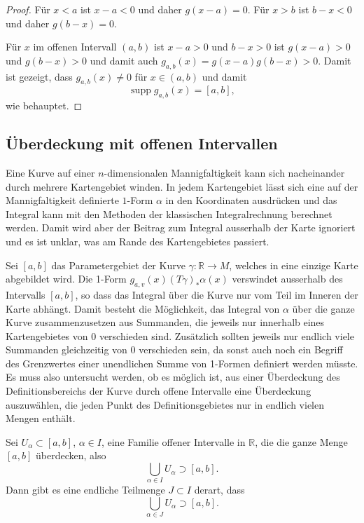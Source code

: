 \begin{proof}
Für $x<a$ ist $x-a<0$ und daher $g(x-a)=0$.
Für $x>b$ ist $b-x<0$ und daher $g(b-x)=0$.

Für $x$ im offenen Intervall $(a,b)$ ist $x-a>0$ und $b-x>0$ ist
$g(x-a)>0$ und $g(b-x)>0$ und damit
auch $g_{a,b}(x)=g(x-a)g(b-x)>0$.
Damit ist gezeigt, dass $g_{a,b}(x)\ne 0$ für $x\in(a,b)$ und damit
\[
\operatorname{supp} g_{a,b}(x)
=
[a,b],
\]
wie behauptet.
\end{proof}

%
%
\subsection{Überdeckung mit offenen Intervallen}
Eine Kurve auf einer $n$-dimensionalen Mannigfaltigkeit kann sich
nacheinander durch mehrere Kartengebiet winden.
In jedem Kartengebiet lässt sich eine auf der Mannigfaltigkeit
definierte $1$-Form $\alpha$ in den Koordinaten ausdrücken und das
Integral kann mit den Methoden der klassischen Integralrechnung
berechnet werden.
Damit wird aber der Beitrag zum Integral ausserhalb der Karte
ignoriert und es ist unklar, was am Rande des Kartengebietes
passiert.

Sei $[a,b]$ das Parametergebiet der Kurve $\gamma\colon\mathbb{R}\to M$,
welches in eine einzige Karte abgebildet wird.
Die 1-Form $g_{a,v}(x)(T\gamma)_*\alpha(x)$ verswindet ausserhalb
des Intervalls $[a,b]$, so dass das Integral über die Kurve nur
vom Teil im Inneren der Karte abhängt.
Damit besteht die Möglichkeit, das Integral von $\alpha$ über
die ganze Kurve zusammenzusetzen aus Summanden, die jeweils nur
innerhalb eines Kartengebietes von $0$ verschieden sind.
Zusätzlich sollten jeweils nur endlich viele Summanden gleichzeitig
von 0 verschieden sein, da sonst auch noch ein Begriff des Grenzwertes
einer unendlichen Summe von 1-Formen definiert werden müsste.
Es muss also untersucht werden, ob es möglich ist, aus einer
Überdeckung des Definitionsbereichs der Kurve durch offene Intervalle
eine Überdeckung auszuwählen, die jeden Punkt des Definitionsgebietes
nur in endlich vielen Mengen enthält.

\begin{satz}
\label{buch:kurvenintegral:zerlegung:satz:kompakt}
Sei $U_\alpha \subset [a,b]$, $\alpha\in I$, eine Familie offener
Intervalle in $\mathbb{R}$, die die ganze Menge $[a,b]$ überdecken,
also
\[
\bigcup_{\alpha\in I} U_\alpha \supset [a,b].
\]
Dann gibt es eine endliche Teilmenge $J\subset I$ derart, dass
\[
\bigcup_{\alpha\in J}U_\alpha\supset [a,b].
\]
\end{satz}

